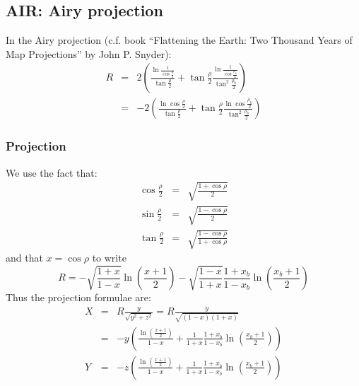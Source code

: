 \subsection{AIR: Airy projection}

  In the Airy projection (c.f. book ``Flattening the Earth: Two Thousand Years of Map Projections'' by John P. Snyder):
  \begin{eqnarray}
    R & = & 2\left(\frac{\ln\frac{1}{\cos\frac{\rho}{2}}}{\tan\frac{\rho}{2}}
                + \tan\frac{\rho}{2} \frac{\ln\frac{1}{\cos\frac{\rho_b}{2}}}{\tan^2\frac{\rho_b}{2}}
        \right) \\
      & = & -2\left(\frac{\ln \cos\frac{\rho}{2}}{\tan\frac{\rho}{2}}
                + \tan\frac{\rho}{2} \frac{\ln \cos\frac{\rho_b}{2}}{\tan^2\frac{\rho_b}{2}} \right)
  \end{eqnarray}

  \subsubsection{Projection}

    We use the fact that:
    \begin{eqnarray}
      \cos\frac{\rho}{2} & = & \sqrt{\frac{1 + \cos\rho}{2}} \\
      \sin\frac{\rho}{2} & = & \sqrt{\frac{1 - \cos\rho}{2}} \\
      \tan\frac{\rho}{2} & = & \sqrt{\frac{1 - \cos\rho}{1 + \cos\rho}}
    \end{eqnarray}
    and that $x = \cos\rho$ to write
    \begin{equation}
      R = -\sqrt{\frac{1 + x}{1 - x}} \ln(\frac{x+1}{2})
        - \sqrt{\frac{1 - x}{1 + x}} \frac{1 + x_b}{1 - x_b}\ln(\frac{x_b+1}{2})
    \end{equation}
    Thus the projection formulae are:
    \begin{eqnarray}
      X & = & R \frac{y}{\sqrt{y^2 + z^2}} = R \frac{y}{\sqrt{(1-x)(1+x)}} \\
        & = & -y\left(\frac{\ln(\frac{x+1}{2})}{1-x}
                 + \frac{1}{1+x}\frac{1 + x_b}{1 - x_b}\ln(\frac{x_b+1}{2}) \right) \\
      Y & = & -z\left(\frac{\ln(\frac{x+1}{2})}{1-x}
                 + \frac{1}{1+x}\frac{1 + x_b}{1 - x_b}\ln(\frac{x_b+1}{2}) \right)
    \end{eqnarray}

